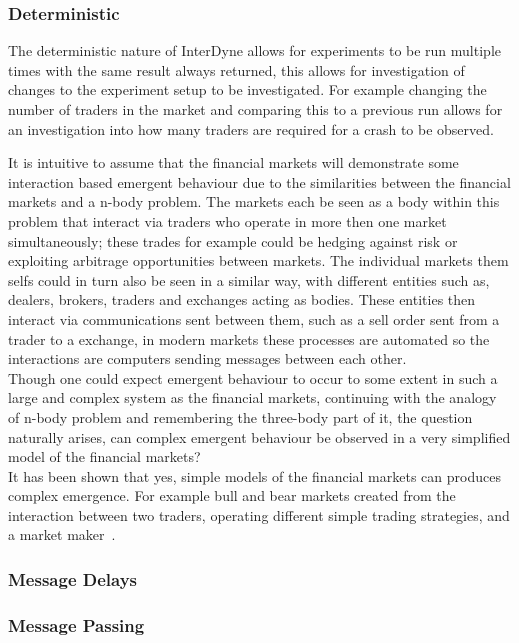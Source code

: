 \documentclass{article}
\begin{document}
\subsubsection{Deterministic}

The deterministic nature of InterDyne allows for experiments to be run multiple times with the same result always returned, this allows for investigation of changes to the experiment setup to be investigated. For example changing the number of traders in the market and comparing this to a previous run allows for an investigation into how many traders are required for a crash to be observed. 


It is intuitive to assume that the financial markets will demonstrate some interaction based emergent behaviour due to the similarities between the financial markets and a n-body problem. The markets each be seen as a body within this problem that interact via traders who operate in more then one market simultaneously; these trades for example could be hedging against risk or exploiting arbitrage opportunities between markets. The individual markets them selfs could in turn also be seen in a similar way, with different entities such as, dealers, brokers, traders and exchanges acting as bodies. These entities then interact via communications sent between them, such as a sell order sent from a trader to a exchange, in modern markets these processes are automated so the interactions are computers sending messages between each other.\\
Though one could expect emergent behaviour to occur to some extent in such a large and complex system as the financial markets, continuing with the analogy of n-body problem and remembering the three-body part of it, the question naturally arises, can complex emergent behaviour be observed in a very simplified model of the financial markets?\\
It has been shown that yes, simple models of the financial markets can produces complex emergence. For example bull and bear markets created from the interaction between two traders, operating different simple trading strategies, and a market maker~\cite{bearandbull}.


\subsubsection{Message Delays}

\subsubsection{Message Passing}
\end{document}
